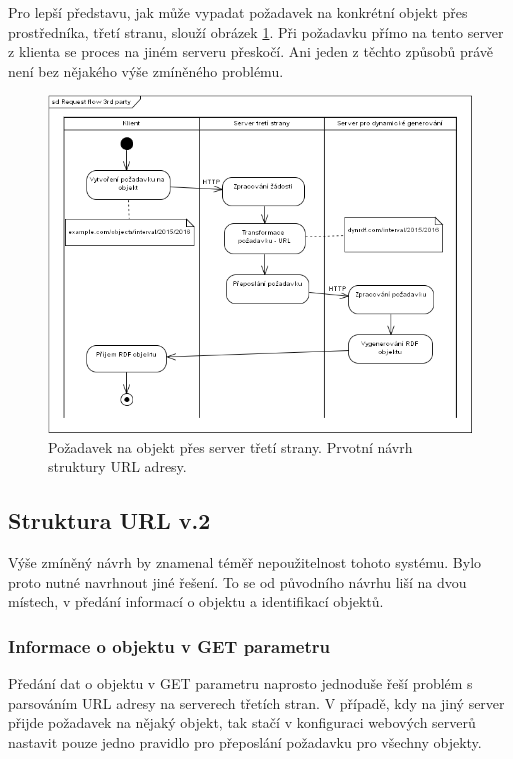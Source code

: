 \documentclass[thesis=B,czech]{FITthesis}[2012/06/26]
\begin{document}
 Pro lepší představu, jak může vypadat požadavek na konkrétní objekt přes prostředníka, třetí stranu, slouží obrázek \ref{request_flow_2}. Při požadavku
 přímo na tento server z klienta se proces na jiném serveru přeskočí. Ani jeden z těchto způsobů právě není bez nějakého výše zmíněného problému. 
 \begin{figure}\centering
 	\includegraphics[width=1\textwidth]{request_flow_2}
 	\caption[Požadavek na objekt přes server třetí strany]{Požadavek na objekt přes server třetí strany. Prvotní návrh struktury URL adresy.}\label{request_flow_2}
 \end{figure}
 
 \subsection{Struktura URL v.2}
  Výše zmíněný návrh by znamenal téměř nepoužitelnost tohoto systému. Bylo proto nutné navrhnout jiné řešení. To se od původního návrhu liší na dvou místech, v předání
  informací o objektu a identifikací objektů.
  
  \subsubsection{Informace o objektu v GET parametru}
   Předání dat o objektu v GET parametru naprosto jednoduše řeší problém s parsováním URL adresy na serverech třetích stran. V případě, kdy na jiný server přijde požadavek
   na nějaký objekt, tak stačí v konfiguraci webových serverů nastavit pouze jedno pravidlo pro přeposlání požadavku pro všechny objekty.
  
\end{document}
